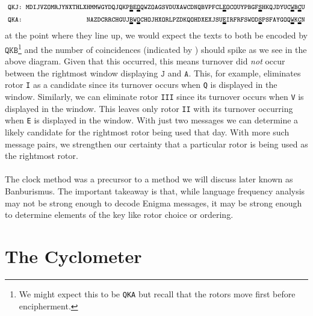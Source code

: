 \begin{align*}
  &\footnotesize\texttt{QKJ:
  MDIJVZOMRJYNXTHLXHMMWGYDQJQKP}\dunderline{2pt}{\texttt{B}}\texttt{E}\dunderline{2pt}{\texttt{O}}\texttt{QWZOAGSVDUXAWCDNQBVPFCL}\dunderline{2pt}{\texttt{E}}\texttt{OCOUYPBGF}\dunderline{2pt}{\texttt{S}}\texttt{HKQJDYUC}\dunderline{2pt}{\texttt{W}}\texttt{B}\dunderline{2pt}{\texttt{C}}\texttt{U}
  \\
  &\footnotesize\texttt{QKA:\ \ \ \ \ \ \ \ \ \ \ \ \ \ \ \ \ \
  NAZDCRRCHGUJ}\dunderline{2pt}{\texttt{B}}\texttt{W}\dunderline{2pt}{\texttt{O}}\texttt{CHOJHXORLPZDKQOHDXEXJSU}\dunderline{2pt}{\texttt{E}}\texttt{IRFRFSWOD}\dunderline{2pt}{\texttt{S}}\texttt{PSFAYGOQ}\dunderline{2pt}{\texttt{W}}\texttt{K}\dunderline{2pt}{\texttt{C}}\texttt{N}
\end{align*}
at the point where they line up, we would expect the texts to both be encoded by
$\texttt{QKB}$\footnote{We might expect this to be \texttt{QKA} but
recall that the rotors move first before encipherment.} and the
number of coincidences (indicated by \dunderline{2pt}{\texttt{ }})
should spike as we see in the above diagram. Given that
this occurred, this means turnover did \emph{not} occur between the
rightmost window displaying $\texttt{J}$ and
$\texttt{A}$. This, for example, eliminates rotor \texttt{I} as a
candidate since its turnover occurs when \texttt{Q} is displayed in
the window. Similarly, we can eliminate rotor \texttt{III} since its
turnover occurs when \texttt{V} is displayed in the window. This
leaves only rotor \texttt{II} with its turnover occurring when
\texttt{E} is displayed in the window. With just two messages we can
determine a likely candidate for the rightmost rotor being used that
day. With more such message pairs, we strengthen our certainty that a
particular rotor is being used as the rightmost rotor.
\\\\The clock method was
a precursor to a method we will discuss later known as Banburismus.
The important takeaway is that, while language frequency analysis may not be
strong enough to decode Enigma messages, it may be strong enough to
determine elements of the key like rotor choice or ordering.

\section{The Cyclometer}\label{cyclometer}

